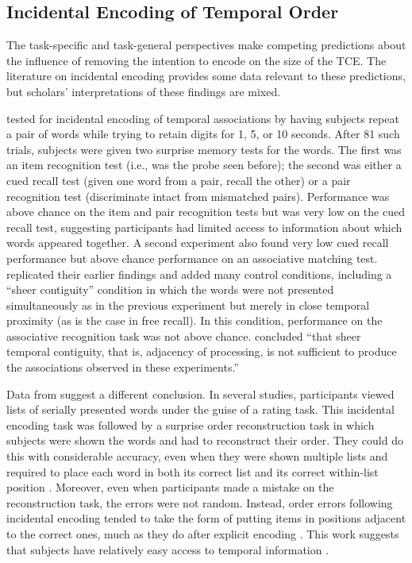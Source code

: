 \documentclass[man,natbib,floatsintext]{apa6} %
\begin{document}
\subsection{Incidental Encoding of Temporal Order}
The task-specific and task-general perspectives make competing predictions about the influence of removing the intention to encode on the size of the TCE. The literature on incidental encoding provides some data relevant to these predictions, but scholars' interpretations of these findings are mixed. 

\citet{GlenBrad79} tested for incidental encoding of temporal associations by having subjects repeat a pair of words while trying to retain digits for 1, 5, or 10 seconds. After 81 such trials, subjects were given two surprise memory tests for the words. The first was an item recognition test (i.e., was the probe seen before); the second was either a cued recall test (given one word from a pair, recall the other) or a pair recognition test (discriminate intact from mismatched pairs). Performance was above chance on the item and pair recognition tests but was very low on the cued recall test, suggesting participants had limited access to information about which words appeared together. A second experiment also found very low cued recall performance but above chance performance on an associative matching test. \citet{BradGlen83} replicated their earlier findings and added many control conditions, including a ``sheer contiguity'' condition in which the words were not presented simultaneously as in the previous experiment but merely in close temporal proximity (as is the case in free recall). In this condition, performance on the associative recognition task was not above chance. \citet[][p. 665]{BradGlen83} concluded ``that sheer temporal contiguity, that is, adjacency of processing, is not sufficient to produce the associations observed in these experiments.''

Data from \citet{Nair91, Nair90b} suggest a different conclusion. In several studies, participants viewed lists of serially presented words under the guise of a rating task. This incidental encoding task was followed by a surprise order reconstruction task in which subjects were shown the words and had to reconstruct their order. They could do this with considerable accuracy, even when they were shown multiple lists and required to place each word in both its correct list and its correct within-list position \citep{Nair91}. Moreover, even when participants made a mistake on the reconstruction task, the errors were not random. Instead, order errors following incidental encoding tended to take the form of putting items in positions adjacent to the correct ones, much as they do after explicit encoding \citep{Heal74}. This work suggests that subjects have relatively easy access to temporal information \citep[for related examples of access to order information after incidental encoding see,][]{Burn96,SerrNair93}. 
\end{document}
